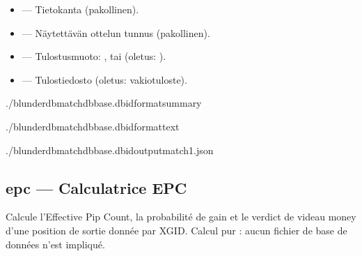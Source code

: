 \documentclass[letterpaper,10pt,finnish]{sphinxmanual}
\begin{document}
\sphinxAtStartPar
{}
\begin{itemize}
\item {} 
\sphinxAtStartPar
{} — Tietokanta (pakollinen).

\item {} 
\sphinxAtStartPar
{} — Näytettävän ottelun tunnus (pakollinen).

\item {} 
\sphinxAtStartPar
{} — Tulostusmuoto: ,  tai  (oletus: ).

\item {} 
\sphinxAtStartPar
{} — Tulostiedosto (oletus: vakiotuloste).

\end{itemize}

\sphinxAtStartPar
{}

\begin{sphinxVerbatim}[commandchars=\\\{\}]
./blunderdbmatch\PYGZhy{}\PYGZhy{}dbbase.db\PYGZhy{}\PYGZhy{}id\PYGZhy{}\PYGZhy{}formatsummary

./blunderdbmatch\PYGZhy{}\PYGZhy{}dbbase.db\PYGZhy{}\PYGZhy{}id\PYGZhy{}\PYGZhy{}formattext

./blunderdbmatch\PYGZhy{}\PYGZhy{}dbbase.db\PYGZhy{}\PYGZhy{}id\PYGZhy{}\PYGZhy{}outputmatch1.json
\end{sphinxVerbatim}


\subsection{epc — Calculatrice EPC}
\label{\detokenize{cli:epc-calculatrice-epc}}
\sphinxAtStartPar
Calcule l’Effective Pip Count, la probabilité de gain et le verdict de videau
money d’une position de sortie donnée par XGID. Calcul pur : aucun fichier de
base de données n’est impliqué.
\end{document}
